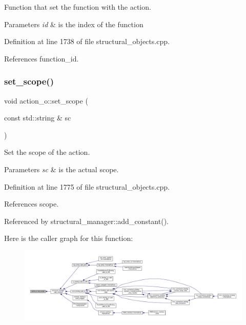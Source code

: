 Function that set the function with the action. 


\begin{DoxyParams}{Parameters}
{\em id} & is the index of the function \\
\hline
\end{DoxyParams}


Definition at line 1738 of file structural\+\_\+objects.\+cpp.



References function\+\_\+id.

\mbox{\label{classaction__o_a9f4c91fe76ac45b6b7947b7e951a98db}} 
\subsubsection{\texorpdfstring{set\+\_\+scope()}{set\_scope()}}
{\footnotesize\ttfamily void action\+\_\+o\+::set\+\_\+scope (\begin{DoxyParamCaption}\item[{const std\+::string \&}]{sc }\end{DoxyParamCaption})}



Set the scope of the action. 


\begin{DoxyParams}{Parameters}
{\em sc} & is the actual scope. \\
\hline
\end{DoxyParams}


Definition at line 1775 of file structural\+\_\+objects.\+cpp.



References scope.



Referenced by structural\+\_\+manager\+::add\+\_\+constant().

Here is the caller graph for this function\+:
\nopagebreak
\begin{figure}[H]
\begin{center}
\leavevmode
\includegraphics[width=350pt]{d2/ded/classaction__o_a9f4c91fe76ac45b6b7947b7e951a98db_icgraph}
\end{center}
\end{figure}
\mbox{\label{classaction__o_ab48f20e726813634d18e4702b199874b}} 
